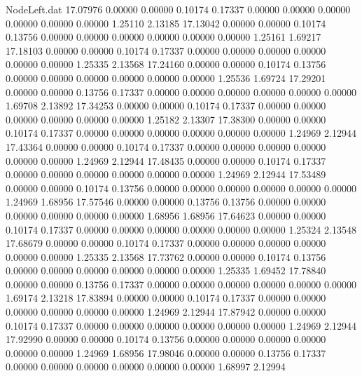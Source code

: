 \begin{filecontents}{NodeLeft.dat}
  17.07976    0.00000    0.00000     0.10174    0.17337    0.00000    0.00000    0.00000    0.00000    0.00000    0.00000    1.25110    2.13185
  17.13042    0.00000    0.00000     0.10174    0.13756    0.00000    0.00000    0.00000    0.00000    0.00000    0.00000    1.25161    1.69217
  17.18103    0.00000    0.00000     0.10174    0.17337    0.00000    0.00000    0.00000    0.00000    0.00000    0.00000    1.25335    2.13568
  17.24160    0.00000    0.00000     0.10174    0.13756    0.00000    0.00000    0.00000    0.00000    0.00000    0.00000    1.25536    1.69724
  17.29201    0.00000    0.00000     0.13756    0.17337    0.00000    0.00000    0.00000    0.00000    0.00000    0.00000    1.69708    2.13892
  17.34253    0.00000    0.00000     0.10174    0.17337    0.00000    0.00000    0.00000    0.00000    0.00000    0.00000    1.25182    2.13307
  17.38300    0.00000    0.00000     0.10174    0.17337    0.00000    0.00000    0.00000    0.00000    0.00000    0.00000    1.24969    2.12944
  17.43364    0.00000    0.00000     0.10174    0.17337    0.00000    0.00000    0.00000    0.00000    0.00000    0.00000    1.24969    2.12944
  17.48435    0.00000    0.00000     0.10174    0.17337    0.00000    0.00000    0.00000    0.00000    0.00000    0.00000    1.24969    2.12944
  17.53489    0.00000    0.00000     0.10174    0.13756    0.00000    0.00000    0.00000    0.00000    0.00000    0.00000    1.24969    1.68956
  17.57546    0.00000    0.00000     0.13756    0.13756    0.00000    0.00000    0.00000    0.00000    0.00000    0.00000    1.68956    1.68956
  17.64623    0.00000    0.00000     0.10174    0.17337    0.00000    0.00000    0.00000    0.00000    0.00000    0.00000    1.25324    2.13548
  17.68679    0.00000    0.00000     0.10174    0.17337    0.00000    0.00000    0.00000    0.00000    0.00000    0.00000    1.25335    2.13568
  17.73762    0.00000    0.00000     0.10174    0.13756    0.00000    0.00000    0.00000    0.00000    0.00000    0.00000    1.25335    1.69452
  17.78840    0.00000    0.00000     0.13756    0.17337    0.00000    0.00000    0.00000    0.00000    0.00000    0.00000    1.69174    2.13218
  17.83894    0.00000    0.00000     0.10174    0.17337    0.00000    0.00000    0.00000    0.00000    0.00000    0.00000    1.24969    2.12944
  17.87942    0.00000    0.00000     0.10174    0.17337    0.00000    0.00000    0.00000    0.00000    0.00000    0.00000    1.24969    2.12944
  17.92990    0.00000    0.00000     0.10174    0.13756    0.00000    0.00000    0.00000    0.00000    0.00000    0.00000    1.24969    1.68956
  17.98046    0.00000    0.00000     0.13756    0.17337    0.00000    0.00000    0.00000    0.00000    0.00000    0.00000    1.68997    2.12994

\end{filecontents}
